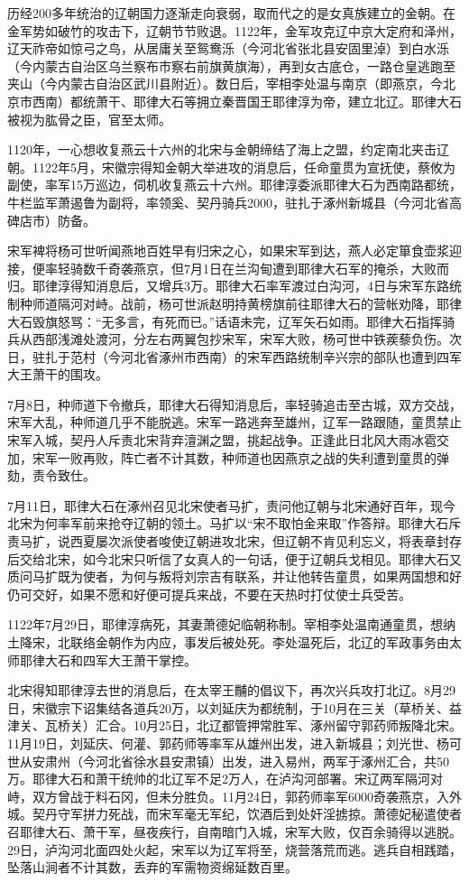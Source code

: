 历经200多年统治的辽朝国力逐渐走向衰弱，取而代之的是女真族建立的金朝。在金军势如破竹的攻击下，辽朝节节败退。1122年，金军攻克辽中京大定府和泽州，辽天祚帝如惊弓之鸟，从居庸关至鸳鸯泺（今河北省张北县安固里淖）到白水泺（今内蒙古自治区乌兰察布市察右前旗黄旗海），再到女古底仓，一路仓皇逃跑至夹山（今内蒙古自治区武川县附近）。数日后，宰相李处温与南京（即燕京，今北京市西南）都统萧干、耶律大石等拥立秦晋国王耶律淳为帝，建立北辽。耶律大石被视为肱骨之臣，官至太师。

1120年，一心想收复燕云十六州的北宋与金朝缔结了海上之盟，约定南北夹击辽朝。1122年5月，宋徽宗得知金朝大举进攻的消息后，任命童贯为宣抚使，蔡攸为副使，率军15万巡边，伺机收复燕云十六州。耶律淳委派耶律大石为西南路都统，牛栏监军萧遏鲁为副将，率领奚、契丹骑兵2000，驻扎于涿州新城县（今河北省高碑店市）防备。

宋军裨将杨可世听闻燕地百姓早有归宋之心，如果宋军到达，燕人必定箪食壶浆迎接，便率轻骑数千奇袭燕京，但7月1日在兰沟甸遭到耶律大石军的掩杀，大败而归。耶律淳得知消息后，又增兵3万。耶律大石率军渡过白沟河，4日与宋军东路统制种师道隔河对峙。战前，杨可世派赵明持黄榜旗前往耶律大石的营帐劝降，耶律大石毁旗怒骂：“无多言，有死而已。”话语未完，辽军矢石如雨。耶律大石指挥骑兵从西部浅滩处渡河，分左右两翼包抄宋军，宋军大败，杨可世中铁蒺藜负伤。次日，驻扎于范村（今河北省涿州市西南）的宋军西路统制辛兴宗的部队也遭到四军大王萧干的围攻。

7月8日，种师道下令撤兵，耶律大石得知消息后，率轻骑追击至古城，双方交战，宋军大乱，种师道几乎不能脱逃。宋军一路逃奔至雄州，辽军一路跟随，童贯禁止宋军入城，契丹人斥责北宋背弃澶渊之盟，挑起战争。正逢此日北风大雨冰雹交加，宋军一败再败，阵亡者不计其数，种师道也因燕京之战的失利遭到童贯的弹劾，责令致仕。

7月11日，耶律大石在涿州召见北宋使者马扩，责问他辽朝与北宋通好百年，现今北宋为何率军前来抢夺辽朝的领土。马扩以“宋不取怕金来取”作答辩。耶律大石斥责马扩，说西夏屡次派使者唆使辽朝进攻北宋，但辽朝不肯见利忘义，将表章封存后交给北宋，如今北宋只听信了女真人的一句话，便于辽朝兵戈相见。耶律大石又质问马扩既为使者，为何与叛将刘宗吉有联系，并让他转告童贯，如果两国想和好仍可交好，如果不愿和好便可提兵来战，不要在天热时打仗使士兵受苦。

1122年7月29日，耶律淳病死，其妻萧德妃临朝称制。宰相李处温南通童贯，想纳土降宋，北联络金朝作为内应，事发后被处死。李处温死后，北辽的军政事务由太师耶律大石和四军大王萧干掌控。

北宋得知耶律淳去世的消息后，在太宰王黼的倡议下，再次兴兵攻打北辽。8月29日，宋徽宗下诏集结各道兵20万，以刘延庆为都统制，于10月在三关（草桥关、益津关、瓦桥关）汇合。10月25日，北辽都管押常胜军、涿州留守郭药师叛降北宋。11月19日，刘延庆、何灌、郭药师等率军从雄州出发，进入新城县；刘光世、杨可世从安肃州（今河北省徐水县安肃镇）出发，进入易州，两军于涿州汇合，共50万。耶律大石和萧干统帅的北辽军不足2万人，在泸沟河部署。宋辽两军隔河对峙，双方曾战于料石冈，但未分胜负。11月24日，郭药师率军6000奇袭燕京，入外城。契丹守军拼力死战，而宋军毫无军纪，饮酒后到处奸淫掳掠。萧德妃秘遣使者召耶律大石、萧干军，昼夜疾行，自南暗门入城，宋军大败，仅百余骑得以逃脱。29日，泸沟河北面四处火起，宋军以为辽军将至，烧营落荒而逃。逃兵自相践踏，坠落山涧者不计其数，丢弃的军需物资绵延数百里。

